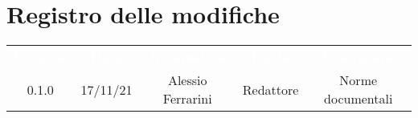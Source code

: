 \section*{Registro delle modifiche}

{\renewcommand{\arraystretch}{1.5}
\begin{tabular}{ccccc}
	\rowcolor[RGB]{33, 73, 50}
	\textcolor{white}{\textbf{Versione}} & \textcolor{white}{\textbf{Data}} & \textcolor{white}
	{\textbf{Nominativo}} & \textcolor{white}{\textbf{Ruolo}} & \textcolor{white}
	{\textbf{Descrizione}}\\
	\rowcolor[RGB]{216, 235, 171}
	0.1.0 & 17/11/21 & Alessio Ferrarini & Redattore & Norme documentali\\
	
\end{tabular}	
}